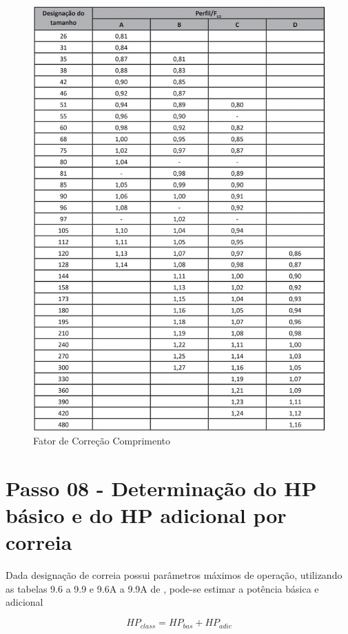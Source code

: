 \begin{figure}[p]
	\centering
	\caption{Fator de Correção Comprimento}
    \label{correcao_comprimento}
	\includegraphics[scale=0.7]{Imagens/correcao_comprimento.png}
\end{figure}

\pagebreak
\section{Passo 08 - Determinação do HP básico e do HP adicional por correia}

Dada designação de correia possui parâmetros máximos de operação, utilizando as tabelas 9.6 a 9.9 e 9.6A a 9.9A de \cite{EMA_Barbieri}, pode-se estimar a potência básica e adicional

\begin{equation}
    HP_{class} = HP_{bas} + HP_{adic}
\end{equation}

